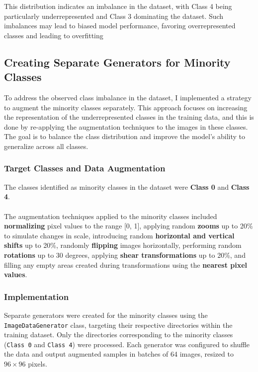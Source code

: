 \documentclass{article}
\begin{document}
\noindent
This distribution indicates an imbalance in the dataset, with Class 4 being particularly underrepresented and Class 3 dominating the dataset. Such imbalances may lead to biased model performance, favoring overrepresented classes and leading to overfitting

\subsection{Creating Separate Generators for Minority Classes}

To address the observed class imbalance in the dataset, I implemented a strategy to augment the minority classes separately. This approach focuses on increasing the representation of the underrepresented classes in the training data, and this is done by re-applying the augmentation techniques to the images in these classes. The goal is to balance the class distribution and improve the model's ability to generalize across all classes.

\subsubsection{Target Classes and Data Augmentation}

The classes identified as minority classes in the dataset were \textbf{Class 0} and \textbf{Class 4}.
\\\\
The augmentation techniques applied to the minority classes included \textbf{normalizing} pixel values to the range [0, 1], applying random \textbf{zooms} up to 20\% to simulate changes in scale, introducing random \textbf{horizontal and vertical shifts} up to 20\%, randomly \textbf{flipping} images horizontally, performing random \textbf{rotations} up to 30 degrees, applying \textbf{shear transformations} up to 20\%, and filling any empty areas created during transformations using the \textbf{nearest pixel values}.

\subsubsection{Implementation}

Separate generators were created for the minority classes using the \texttt{ImageDataGenerator} class, targeting their respective directories within the training dataset. Only the directories corresponding to the minority classes (\texttt{Class 0} and \texttt{Class 4}) were processed. Each generator was configured to shuffle the data and output augmented samples in batches of 64 images, resized to \(96 \times 96\) pixels.
\end{document}
